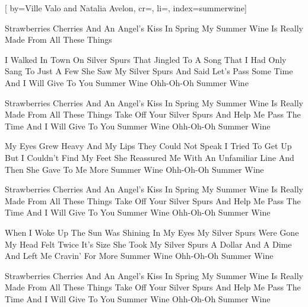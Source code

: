 

[%
    by={Ville Valo and Natalia Avelon},
    cr={},
    li={},
    index={summerwine}]


    \label{summerwine}

    \beginverse*
        Strawberries Cherries And An Angel's Kiss In Spring
        My Summer Wine Is Really Made From All These Things
    \endverse

    \beginverse\memorize[verse]
        I Walked In Town On Silver Spurs That Jingled To
        A Song That I Had Only Sang To Just A Few
        She Saw My Silver Spurs And Said Let's Pass Some Time
        And I Will Give To You Summer Wine
        Ohh-Oh-Oh Summer Wine
    \endverse

    \beginchorus\memorize[chorus]
        Strawberries Cherries And An Angel's Kiss In Spring
        My Summer Wine Is Really Made From All These Things
        Take Off Your Silver Spurs And Help Me Pass The Time
        And I Will Give To You Summer Wine
        Ohh-Oh-Oh Summer Wine
    \endchorus

    \beginverse\replay[verse]
        My Eyes Grew Heavy And My Lips They Could Not Speak
        I Tried To Get Up But I Couldn't Find My Feet
        She Reassured Me With An Unfamiliar Line
        And Then She Gave To Me More Summer Wine
        Ohh-Oh-Oh Summer Wine
    \endverse

    \beginchorus\replay[chorus]
        Strawberries Cherries And An Angel's Kiss In Spring
        My Summer Wine Is Really Made From All These Things
        Take Off Your Silver Spurs And Help Me Pass The Time
        And I Will Give To You Summer Wine
        Ohh-Oh-Oh Summer Wine
    \endchorus

    \beginverse\replay[verse]
        When I Woke Up The Sun Was Shining In My Eyes
        My Silver Spurs Were Gone My Head Felt Twice It's Size
        She Took My Silver Spurs A Dollar And A Dime
        And Left Me Cravin' For More Summer Wine
        Ohh-Oh-Oh Summer Wine
    \endverse

    \beginchorus\replay[chorus]
        Strawberries Cherries And An Angel's Kiss In Spring
        My Summer Wine Is Really Made From All These Things
        Take Off Your Silver Spurs And Help Me Pass The Time
        And I Will Give To You Summer Wine
        Ohh-Oh-Oh Summer Wine
    \endchorus
\endsong
